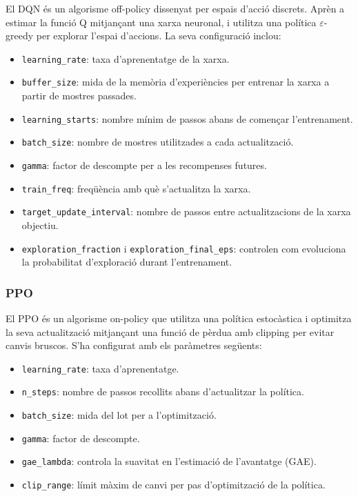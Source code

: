 \documentclass[12pt,a4paper,twoside]{book}
\begin{document}
El DQN és un algorisme off-policy dissenyat per espais d'acció discrets. Aprèn a estimar la funció Q mitjançant una xarxa neuronal, i utilitza una política $\varepsilon$-greedy per explorar l'espai d'accions. La seva configuració inclou:

\begin{itemize}
    \item \texttt{learning\_rate}: taxa d'aprenentatge de la xarxa.
    \item \texttt{buffer\_size}: mida de la memòria d'experiències per entrenar la xarxa a partir de mostres passades.
    \item \texttt{learning\_starts}: nombre mínim de passos abans de començar l'entrenament.
    \item \texttt{batch\_size}: nombre de mostres utilitzades a cada actualització.
    \item \texttt{gamma}: factor de descompte per a les recompenses futures.
    \item \texttt{train\_freq}: freqüència amb què s'actualitza la xarxa.
    \item \texttt{target\_update\_interval}: nombre de passos entre actualitzacions de la xarxa objectiu.
    \item \texttt{exploration\_fraction} i \texttt{exploration\_final\_eps}: controlen com evoluciona la probabilitat d'exploració durant l'entrenament.
\end{itemize}

\subsubsection{PPO}

El PPO és un algorisme on-policy que utilitza una política estocàstica i optimitza la seva actualització mitjançant una funció de pèrdua amb clipping per evitar canvis bruscos. S'ha configurat amb els paràmetres següents:

\begin{itemize}
    \item \texttt{learning\_rate}: taxa d'aprenentatge.
    \item \texttt{n\_steps}: nombre de passos recollits abans d'actualitzar la política.
    \item \texttt{batch\_size}: mida del lot per a l'optimització.
    \item \texttt{gamma}: factor de descompte.
    \item \texttt{gae\_lambda}: controla la suavitat en l'estimació de l'avantatge (GAE).
    \item \texttt{clip\_range}: límit màxim de canvi per pas d'optimització de la política.
\end{itemize}
\end{document}
